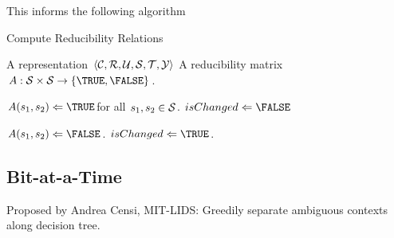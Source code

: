 This informs the following algorithm
\begin{algorithm}                      %
\caption{Compute Reducibility Relations}          %
\label{alg1}                           %
\begin{algorithmic}                    %
  \REQUIRE A representation $\ang{\C,\R,\U,\S,\T,\Y}$
  \ENSURE A reducibility matrix $A:\S\times\S\to\{\TRUE,\FALSE\}$.
  \bigskip
  
  \STATE $A(s_1, s_2)\Leftarrow \TRUE$\quad for all $s_1,s_2\in\S$.
  \REPEAT
    \STATE $isChanged \Leftarrow \FALSE$
	  
			  \STATE $A(s_1,s_2)\Leftarrow\FALSE$.
			  \STATE $isChanged\Leftarrow\TRUE$.
			\ENDIF
		  \ENDFOR
		\ENDFOR
	  \ENDIF
    \ENDFOR
\end{algorithmic}
\end{algorithm}

\subsection{Bit-at-a-Time}

Proposed by Andrea Censi, MIT-LIDS: Greedily separate ambiguous contexts along decision tree.
\begin{figure}
\centering
{}
\end{figure}
 
